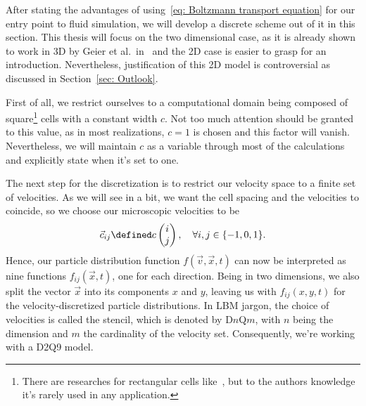 After stating the advantages of using~\eqref{eq: Boltzmann transport equation} for our entry point to fluid simulation, we will develop a discrete scheme out of it in this section.
This thesis will focus on the two dimensional case, as it is already shown to work in 3D by Geier et al.\ in~\cite{geier2015cumulant} and the 2D case is easier to grasp for an introduction. Nevertheless, justification of this 2D model is controversial as discussed in Section~\ref{sec: Outlook}.

First of all, we restrict ourselves to a computational domain being composed of square\footnote{There are researches for rectangular cells like~\cite{Bouzidi2001704}, but to the authors knowledge it's rarely used in any application.} cells with a constant width $c$.
Not too much attention should be granted to this value, as in most realizations, $c=1$ is chosen and this factor will vanish.
Nevertheless, we will maintain $c$ as a variable through most of the calculations and explicitly state when it's set to one.

The next step for the discretization is to restrict our velocity space to a finite set of velocities. As we will see in a bit, we want the cell spacing and the velocities to coincide, so we choose our microscopic velocities to be
\begin{equation}
  \label{eq: definition of the velocities}
  \vec{c}_{ij} \defined c\begin{pmatrix}i \\ j\end{pmatrix}, \quad\forall i,j\in \{-1, 0, 1\}.
\end{equation}
Hence, our particle distribution function $f(\vec{v},\vec{x},t)$ can now be interpreted as nine functions $f_{ij}(\vec{x},t)$, one for each direction.
Being in two dimensions, we also split the vector $\vec{x}$ into its components $x$ and $y$, leaving us with $f_{ij}(x,y,t)$ for the velocity-discretized particle distributions.
In LBM jargon, the choice of velocities is called the stencil, which is denoted by D$n$Q$m$, with $n$ being the dimension and $m$ the cardinality of the velocity set. Consequently, we're working with a D2Q9 model.

